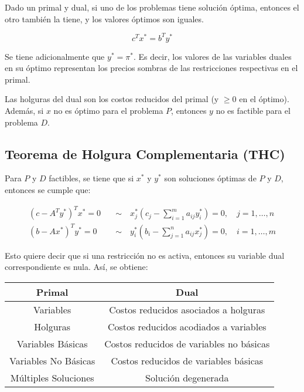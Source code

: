 \documentclass{article}
\begin{document}
Dado un primal y dual, si uno de los problemas tiene solución óptima, entonces el otro también la tiene, y los valores óptimos son iguales.

\begin{equation*}
    c^T x^* = b^T y^*
\end{equation*}

Se tiene adicionalmente que $y^*=\pi^*$. Es decir, los valores de las variables duales en su óptimo representan los precios sombras de las restricciones respectivas en el primal.

Las holguras del dual son los costos reducidos del primal (y $\geq 0$ en el óptimo). Además, si $x$ no es óptimo para el problema $P$, entonces $y$ no es factible para el problema $D$.

\subsection{Teorema de Holgura Complementaria (THC)}

Para $P$ y $D$ factibles, se tiene que si $x^*$ y $y^*$ son soluciones óptimas de $P$ y $D$, entonces se cumple que:

\begin{align*}
    (c - A^T y^*)^T x^* = 0 \quad & \sim \quad x^*_j \left(c_j - \sum_{i=1}^{m}a_{ij}y_i^*\right)=0, \quad j=1,\ldots,n\\
    (b-Ax^*)^T y^* = 0 \quad & \sim \quad y^*_i \left(b_i - \sum_{j=1}^{n}a_{ij}x_j^*\right)=0, \quad i=1,\ldots,m
\end{align*}

Esto quiere decir que si una restricción no es activa, entonces su variable dual correspondiente es nula. Así, se obtiene:

\begin{center}
    \begin{tabular}{|c|c|}
        \hline
        Primal & Dual \\
        \hline
        \hline
        Variables & Costos reducidos asociados a holguras \\
        \hline
        Holguras & Costos reducidos acodiados a variables \\
        \hline
        Variables Básicas & Costos reducidos de variables no básicas \\
        \hline
        Variables No Básicas & Costos reducidos de variables básicas \\
        \hline
        Múltiples Soluciones & Solución degenerada \\
        \hline
    \end{tabular}
\end{center}
\end{document}
